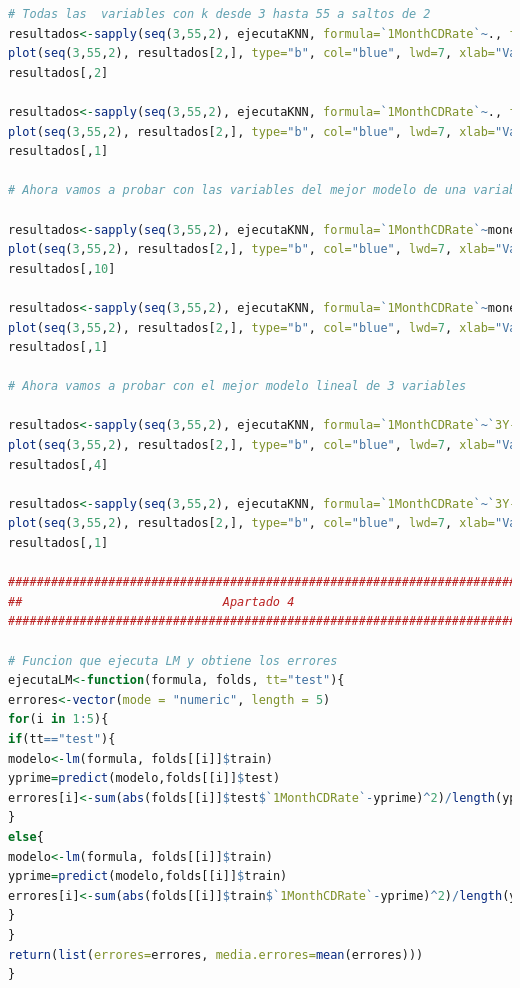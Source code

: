 \documentclass[12pt,a4paper]{article}
\begin{document}
\begin{lstlisting}[basicstyle=\tiny, language=R]
# Todas las  variables con k desde 3 hasta 55 a saltos de 2
resultados<-sapply(seq(3,55,2), ejecutaKNN, formula=`1MonthCDRate`~., folds=folds, tt="test")
plot(seq(3,55,2), resultados[2,], type="b", col="blue", lwd=7, xlab="Valores de K", ylab="Error en test", main = "Grafica de errores por valor de K para test")
resultados[,2]

resultados<-sapply(seq(3,55,2), ejecutaKNN, formula=`1MonthCDRate`~., folds=folds, tt="train")
plot(seq(3,55,2), resultados[2,], type="b", col="blue", lwd=7, xlab="Valores de K", ylab="Error en train", main = "Grafica de errores por valor de K para train")
resultados[,1]

# Ahora vamos a probar con las variables del mejor modelo de una variable

resultados<-sapply(seq(3,55,2), ejecutaKNN, formula=`1MonthCDRate`~moneyStock, folds=folds, tt="test")
plot(seq(3,55,2), resultados[2,], type="b", col="blue", lwd=7, xlab="Valores de K", ylab="Error en test", main = "Grafica de errores por valor de K para test")
resultados[,10]

resultados<-sapply(seq(3,55,2), ejecutaKNN, formula=`1MonthCDRate`~moneyStock, folds=folds, tt="train")
plot(seq(3,55,2), resultados[2,], type="b", col="blue", lwd=7, xlab="Valores de K", ylab="Error en train", main = "Grafica de errores por valor de K para train")
resultados[,1]

# Ahora vamos a probar con el mejor modelo lineal de 3 variables

resultados<-sapply(seq(3,55,2), ejecutaKNN, formula=`1MonthCDRate`~`3Y-CMaturityRate`+moneyStock+tradeCurrencies, folds=folds, tt="test")
plot(seq(3,55,2), resultados[2,], type="b", col="blue", lwd=7, xlab="Valores de K", ylab="Error en test", main = "Grafica de errores por valor de K para test")
resultados[,4]

resultados<-sapply(seq(3,55,2), ejecutaKNN, formula=`1MonthCDRate`~`3Y-CMaturityRate`+moneyStock+tradeCurrencies, folds=folds, tt="train")
plot(seq(3,55,2), resultados[2,], type="b", col="blue", lwd=7, xlab="Valores de K", ylab="Error en train", main = "Grafica de errores por valor de K para train")
resultados[,1]

###########################################################################
##                            Apartado 4                                 ##
###########################################################################

# Funcion que ejecuta LM y obtiene los errores
ejecutaLM<-function(formula, folds, tt="test"){
errores<-vector(mode = "numeric", length = 5)
for(i in 1:5){
if(tt=="test"){
modelo<-lm(formula, folds[[i]]$train)
yprime=predict(modelo,folds[[i]]$test)
errores[i]<-sum(abs(folds[[i]]$test$`1MonthCDRate`-yprime)^2)/length(yprime)
}
else{
modelo<-lm(formula, folds[[i]]$train)
yprime=predict(modelo,folds[[i]]$train)
errores[i]<-sum(abs(folds[[i]]$train$`1MonthCDRate`-yprime)^2)/length(yprime)
}
}
return(list(errores=errores, media.errores=mean(errores)))
}


\end{lstlisting}
\end{document}
